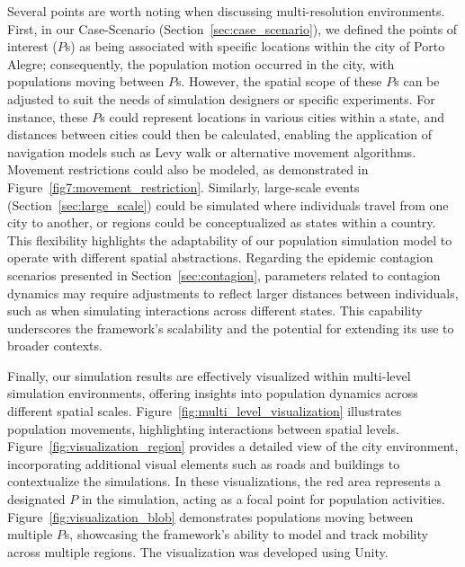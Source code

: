 Several points are worth noting when discussing multi-resolution environments. First, in our Case-Scenario (Section~\ref{sec:case_scenario}), we defined the points of interest ($P$s) as being associated with specific locations within the city of Porto Alegre; consequently, the population motion occurred in the city, with populations moving between $P$s.
However, the spatial scope of these $P$s can be adjusted to suit the needs of simulation designers or specific experiments.
For instance, these $P$s could represent locations in various cities within a state, and distances between cities could then be calculated, enabling the application of navigation models such as Levy walk or alternative movement algorithms. Movement restrictions could also be modeled, as demonstrated in Figure~\ref{fig7:movement_restriction}. 
Similarly, large-scale events (Section~\ref{sec:large_scale}) could be simulated where individuals travel from one city to another, or regions could be conceptualized as states within a country. This flexibility highlights the adaptability of our population simulation model to operate with different spatial abstractions.
Regarding the epidemic contagion scenarios presented in Section~\ref{sec:contagion}, parameters related to contagion dynamics may require adjustments to reflect larger distances between individuals, such as when simulating interactions across different states. This capability underscores the framework's scalability and the potential for extending its use to broader contexts.

Finally, our simulation results are effectively visualized within multi-level simulation environments, offering insights into population dynamics across different spatial scales.
Figure~\ref{fig:multi_level_visualization} illustrates population movements, highlighting interactions between spatial levels.
Figure~\ref{fig:visualization_region} provides a detailed view of the city environment, incorporating additional visual elements such as roads and buildings to contextualize the simulations. In these visualizations, the red area represents a designated $P$ in the simulation, acting as a focal point for population activities.
Figure~\ref{fig:visualization_blob} demonstrates populations moving between multiple $P$s, showcasing the framework’s ability to model and track mobility across multiple regions. The visualization was developed using Unity.

